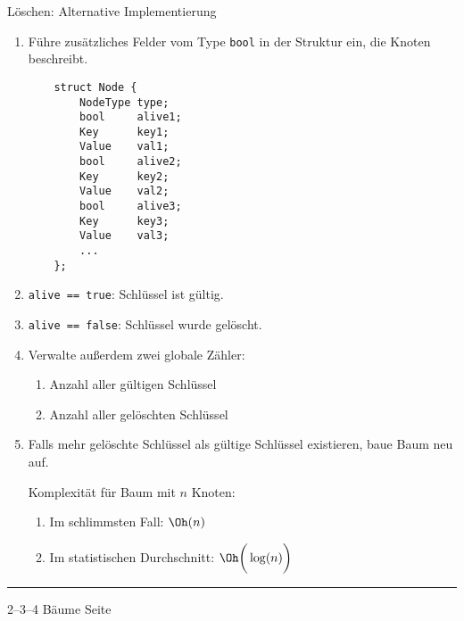 \begin{slide}{}
\normalsize

\begin{center}
L\"oschen: Alternative Implementierung
\end{center}
\vspace*{0.5cm}

\footnotesize

\begin{enumerate}
\item F\"uhre zus\"atzliches Felder vom Type \texttt{bool} in der Struktur ein, die Knoten
      beschreibt.
\begin{verbatim}
    struct Node {
        NodeType type;
        bool     alive1;   
        Key      key1;
        Value    val1;
        bool     alive2;   
        Key      key2;
        Value    val2;
        bool     alive3;   
        Key      key3;
        Value    val3;
        ...
    };
\end{verbatim}
\item \texttt{alive == true}:   Schl\"ussel ist g\"ultig.
\item \texttt{alive == false}:  Schl\"ussel wurde gel\"oscht.
\item Verwalte au{\ss}erdem zwei globale Z\"ahler:
  \begin{enumerate}
  \item Anzahl aller g\"ultigen   Schl\"ussel
  \item Anzahl aller gel\"oschten Schl\"ussel
  \end{enumerate}
\item Falls mehr gel\"oschte  Schl\"ussel als g\"ultige Schl\"ussel existieren,
      baue Baum neu auf.

      Komplexit\"at f\"ur Baum mit $n$ Knoten:
      \begin{enumerate}
      \item Im schlimmsten Fall:           \hspace*{3.1cm} $\Oh(n)$
      \item Im statistischen Durchschnitt: \hspace*{0.3cm} $\Oh\bigg(\log(n)\bigg)$
      \end{enumerate}
\end{enumerate}

\vspace*{\fill}
\tiny \addtocounter{mypage}{1}
\rule{17cm}{1mm}
2--3--4 B\"aume  \hspace*{\fill} Seite 
\end{slide}

